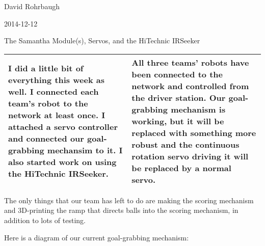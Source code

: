 David Rohrbaugh

2014-12-12

The Samantha Module(s), Servos, and the HiTechnic IRSeeker

\begin{tabular}{|p{5cm}|p{5cm}|}
 \hline
 I did a little bit of everything this week as well. I connected each team's robot to the network at least once. I attached a servo controller and connected our goal-grabbing mechansim to it. I also started work on using the HiTechnic IRSeeker.
 &
 All three teams' robots have been connected to the network and controlled from the driver station. Our goal-grabbing mechanism is working, but it will be replaced with something more robust and the continuous rotation servo driving it will be replaced by a normal servo.
 \\
 \hline
\end{tabular}

\medskip

The only things that our team has left to do are making the scoring mechanism and 3D-printing the ramp that directs balls into the scoring mechanism, in addition to lots of testing.

\medskip

Here is a diagram of our current goal-grabbing mechanism:

\begin{center}
\end{center}